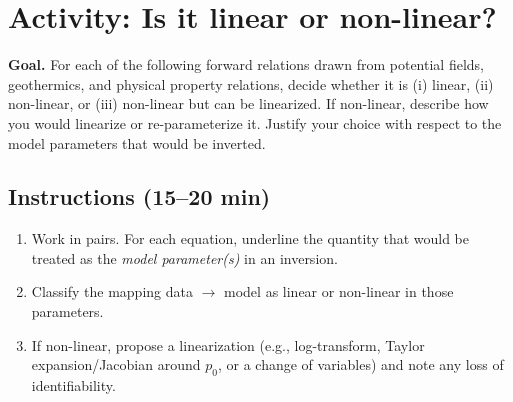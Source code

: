 \section*{Activity: Is it linear or non-linear?}
\textbf{Goal.} For each of the following forward relations drawn from potential fields, geothermics, and physical property relations, decide whether it is (i) linear, (ii) non-linear, or (iii) non-linear but can be linearized. If non-linear, describe how you would linearize or re-parameterize it. Justify your choice with respect to the model parameters that would be inverted.

\subsection*{Instructions (15--20 min)}
\begin{enumerate}[label=\arabic*.,itemsep=2pt]
  \item Work in pairs. For each equation, underline the quantity that would be treated as the \emph{model parameter(s)} in an inversion.
  \item Classify the mapping data $\to$ model as linear or non-linear in those parameters.
  \item If non-linear, propose a linearization (e.g., log-transform, Taylor expansion/Jacobian around $p_0$, or a change of variables) and note any loss of identifiability.
\end{enumerate}

